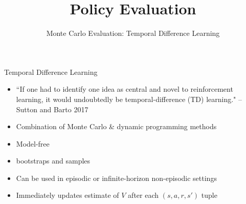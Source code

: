 


\title[Reinforcement Learning: Policy Evaluation]{Policy Evaluation}
\subtitle{Monte Carlo Evaluation: Temporal Difference Learning}




	
	\maketitle


\begin{frame}[c]{Temporal Difference Learning}
	\begin{itemize}
		\item ``If one had to identify one idea as central and novel to reinforcement learning, it would undoubtedly be temporal-difference (TD) learning." -- Sutton and Barto 2017
		\item Combination of Monte Carlo \& dynamic programming methods
		\item Model-free
		\item \alert{bootstraps and samples}
		\item Can be used in episodic or infinite-horizon non-episodic settings
		\item Immediately updates estimate of $V$ after each $(s,a,r,s')$ tuple
	\end{itemize}
	
\end{frame}

